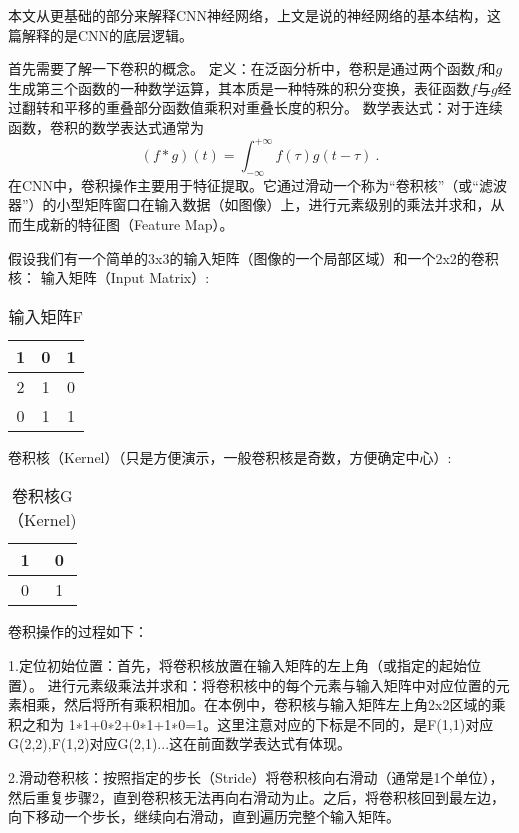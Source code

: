 


本文从更基础的部分来解释CNN神经网络，上文是说的神经网络的基本结构，这篇解释的是CNN的底层逻辑。

首先需要了解一下卷积的概念。
定义：在泛函分析中，卷积是通过两个函数$f$和$g$生成第三个函数的一种数学运算，其本质是一种特殊的积分变换，表征函数$f$与$g$经过翻转和平移的重叠部分函数值乘积对重叠长度的积分。
数学表达式：对于连续函数，卷积的数学表达式通常为
\begin{equation}
(f*g)(t)=\int_{-\infty}^{+\infty}f(\tau)g(t-\tau)~.
\label{juanji}
\end{equation}
在CNN中，卷积操作主要用于特征提取。它通过滑动一个称为“卷积核”（或“滤波器”）的小型矩阵窗口在输入数据（如图像）上，进行元素级别的乘法并求和，从而生成新的特征图（Feature Map）。

假设我们有一个简单的3x3的输入矩阵（图像的一个局部区域）和一个2x2的卷积核：
输入矩阵（Input Matrix）:
\begin{table}[ht]
\centering
\caption{输入矩阵F}\label{tab_CNN21}
\begin{tabular}{|c|c|c|}
\hline
1 & 0 & 1 \\
\hline
2 & 1 & 0 \\
\hline
0 & 1 & 1 \\
\hline
\end{tabular}
\end{table}
卷积核（Kernel）（只是方便演示，一般卷积核是奇数，方便确定中心）:
\begin{table}[ht]
\centering
\caption{卷积核G（Kernel)}\label{tab_CNN22}
\begin{tabular}{|c|c|}
\hline
1 & 0 \\
\hline
0 & 1 \\
\hline
\end{tabular}
\end{table}
卷积操作的过程如下：

1.定位初始位置：首先，将卷积核放置在输入矩阵的左上角（或指定的起始位置）。
进行元素级乘法并求和：将卷积核中的每个元素与输入矩阵中对应位置的元素相乘，然后将所有乘积相加。在本例中，卷积核与输入矩阵左上角2x2区域的乘积之和为 1∗1+0∗2+0∗1+1∗0=1。这里注意对应的下标是不同的，是F(1,1)对应G(2,2),F(1,2)对应G(2,1)...这在前面数学表达式有体现。

2.滑动卷积核：按照指定的步长（Stride）将卷积核向右滑动（通常是1个单位），然后重复步骤2，直到卷积核无法再向右滑动为止。之后，将卷积核回到最左边，向下移动一个步长，继续向右滑动，直到遍历完整个输入矩阵。

